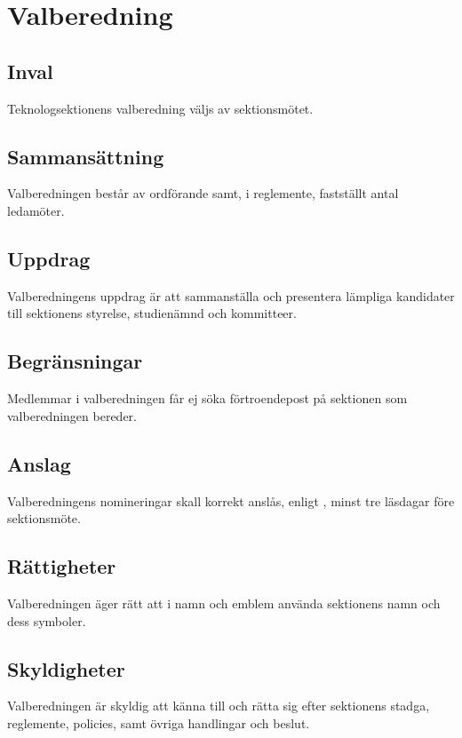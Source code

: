 \section{Valberedning}

\subsection{Inval}
Teknologsektionens valberedning väljs av sektionsmötet.

\subsection{Sammansättning}
Valberedningen består av ordförande samt, i reglemente, fastställt antal ledamöter.

\subsection{Uppdrag}
Valberedningens uppdrag är att sammanställa och presentera lämpliga kandidater
till sektionens styrelse, studienämnd och kommitteer.

\subsection{Begränsningar}
Medlemmar i valberedningen får ej söka förtroendepost på sektionen som valberedningen bereder.

\subsection{Anslag}
Valberedningens nomineringar skall korrekt anslås, enligt , minst tre läsdagar före sektionsmöte.

\subsection{Rättigheter}
Valberedningen äger rätt att i namn och emblem använda sektionens namn och dess symboler.

\subsection{Skyldigheter}
Valberedningen är skyldig att känna till och rätta sig efter sektionens stadga, reglemente, policies, samt övriga handlingar och beslut.